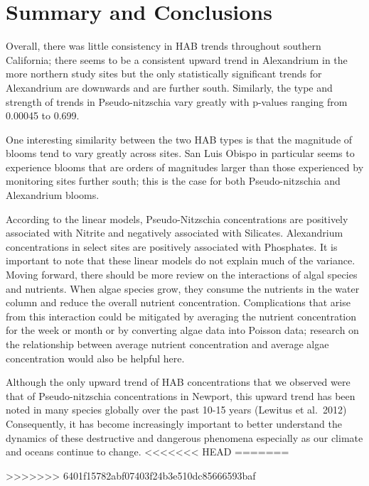 \documentclass[
  12pt,
]{article}
\begin{document}
\newpage

\hypertarget{summary-and-conclusions}{%
\section{Summary and Conclusions}\label{summary-and-conclusions}}

Overall, there was little consistency in HAB trends throughout southern
California; there seems to be a consistent upward trend in Alexandrium
in the more northern study sites but the only statistically significant
trends for Alexandrium are downwards and are further south. Similarly,
the type and strength of trends in Pseudo-nitzschia vary greatly with
p-values ranging from 0.00045 to 0.699.

One interesting similarity between the two HAB types is that the
magnitude of blooms tend to vary greatly across sites. San Luis Obispo
in particular seems to experience blooms that are orders of magnitudes
larger than those experienced by monitoring sites further south; this is
the case for both Pseudo-nitzschia and Alexandrium blooms.

According to the linear models, Pseudo-Nitzschia concentrations are
positively associated with Nitrite and negatively associated with
Silicates. Alexandrium concentrations in select sites are positively
associated with Phosphates. It is important to note that these linear
models do not explain much of the variance. Moving forward, there should
be more review on the interactions of algal species and nutrients. When
algae species grow, they consume the nutrients in the water column and
reduce the overall nutrient concentration. Complications that arise from
this interaction could be mitigated by averaging the nutrient
concentration for the week or month or by converting algae data into
Poisson data; research on the relationship between average nutrient
concentration and average algae concentration would also be helpful
here.

Although the only upward trend of HAB concentrations that we observed
were that of Pseudo-nitzschia concentrations in Newport, this upward
trend has been noted in many species globally over the past 10-15 years
(Lewitus et al.~2012) Consequently, it has become increasingly important
to better understand the dynamics of these destructive and dangerous
phenomena especially as our climate and oceans continue to change.
<<<<<<< HEAD
=======

\newpage
>>>>>>> 6401f15782abf07403f24b3e510dc85666593baf
\end{document}
